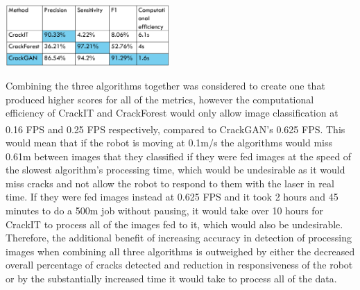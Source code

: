 \documentclass[11pt]{article}		%
\newcommand{\supercite}[1]{\textsuperscript{\cite{#1}}}		%
\newcommand{\tableref}[1]{\hyperref[#1]{Table \ref*{#1}}}     %
\begin{document}
	       \begin{floatingfigure}[r]{0.5\textwidth}
				\centering
				\includegraphics[width=0.47\textwidth]{CrackGAN_comparisonv1}
				\label{crack_comparison}
			\end{floatingfigure}
			
        \hspace*{3ex}Combining the three algorithms together was considered to create one that produced higher scores for all of the metrics, however the computational efficiency of CrackIT and CrackForest would only allow image classification at 0.16 FPS and 0.25 FPS respectively, compared to CrackGAN’s 0.625 FPS.\supercite{CrackGAN1} This would mean that if the robot is moving at 0.1m/s the algorithms would miss 0.61m between images that they classified if they were fed images at the speed of the slowest algorithm’s processing time, which would be undesirable as it would miss cracks and not allow the robot to respond to them with the laser in real time. If they were fed images instead at 0.625 FPS and it took 2 hours and 45 minutes to do a 500m job without pausing, it would take over 10 hours for CrackIT to process all of the images fed to it, which would also be undesirable. Therefore, the additional benefit of increasing accuracy in detection of processing images when combining all three algorithms is outweighed by either the decreased overall percentage of cracks detected and reduction in responsiveness of the robot or by the substantially increased time it would take to process all of the data.
\end{document}
